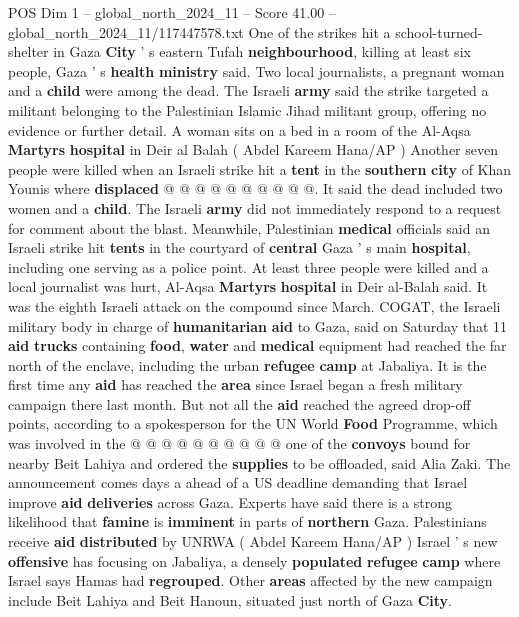 \begin{textsample}{POS Dim 1 – global\_north\_2024\_11 – Score 41.00 – global\_north\_2024\_11/117447578.txt}
One of the strikes hit a school-turned-shelter in Gaza \textbf{City} ' s eastern Tufah \textbf{neighbourhood}, killing at least six people, Gaza ' s \textbf{health} \textbf{ministry} said.
Two local journalists, a pregnant woman and a \textbf{child} were among the dead.
The Israeli \textbf{army} said the strike targeted a militant belonging to the Palestinian Islamic Jihad militant group, offering no evidence or further detail.
A woman sits on a bed in a room of the Al-Aqsa \textbf{Martyrs} \textbf{hospital} in Deir al Balah ( Abdel Kareem Hana/AP ) Another seven people were killed when an Israeli strike hit a \textbf{tent} in the \textbf{southern} \textbf{city} of Khan Younis where \textbf{displaced} @ @ @ @ @ @ @ @ @ @.
It said the dead included two women and a \textbf{child}.
The Israeli \textbf{army} did not immediately respond to a request for comment about the blast.
Meanwhile, Palestinian \textbf{medical} officials said an Israeli strike hit \textbf{tents} in the courtyard of \textbf{central} Gaza ' s main \textbf{hospital}, including one serving as a police point.
At least three people were killed and a local journalist was hurt, Al-Aqsa \textbf{Martyrs} \textbf{hospital} in Deir al-Balah said.
It was the eighth Israeli attack on the compound since March.
COGAT, the Israeli military body in charge of \textbf{humanitarian} \textbf{aid} to Gaza, said on Saturday that 11 \textbf{aid} \textbf{trucks} containing \textbf{food}, \textbf{water} and \textbf{medical} equipment had reached the far north of the enclave, including the urban \textbf{refugee} \textbf{camp} at Jabaliya.
It is the first time any \textbf{aid} has reached the \textbf{area} since Israel began a fresh military campaign there last month.
But not all the \textbf{aid} reached the agreed drop-off points, according to a spokesperson for the UN World \textbf{Food} Programme, which was involved in the @ @ @ @ @ @ @ @ @ @ one of the \textbf{convoys} bound for nearby Beit Lahiya and ordered the \textbf{supplies} to be offloaded, said Alia Zaki.
The announcement comes days a ahead of a US deadline demanding that Israel improve \textbf{aid} \textbf{deliveries} across Gaza.
Experts have said there is a strong likelihood that \textbf{famine} is \textbf{imminent} in parts of \textbf{northern} Gaza.
Palestinians receive \textbf{aid} \textbf{distributed} by UNRWA ( Abdel Kareem Hana/AP ) Israel ' s new \textbf{offensive} has focusing on Jabaliya, a densely \textbf{populated} \textbf{refugee} \textbf{camp} where Israel says Hamas had \textbf{regrouped}.
Other \textbf{areas} affected by the new campaign include Beit Lahiya and Beit Hanoun, situated just north of Gaza \textbf{City}.

\end{textsample}
